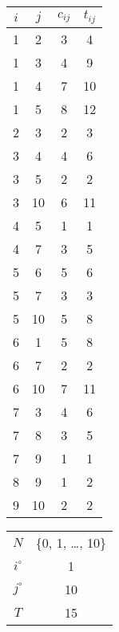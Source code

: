 \documentclass[12pt, letterpaper]{article}
\begin{document}
\begin{center}
  \begin{tabular}{|c|c|c|c|}
    \hline
    \( i \) & \( j \) & \( c_{ij} \) & \( t_{ij} \) \\
    \hline
    1       & 2       & 3            & 4            \\
    1       & 3       & 4            & 9            \\
    1       & 4       & 7            & 10           \\
    1       & 5       & 8            & 12           \\
    2       & 3       & 2            & 3            \\
    3       & 4       & 4            & 6            \\
    3       & 5       & 2            & 2            \\
    3       & 10      & 6            & 11           \\
    4       & 5       & 1            & 1            \\
    4       & 7       & 3            & 5            \\
    5       & 6       & 5            & 6            \\
    5       & 7       & 3            & 3            \\
    5       & 10      & 5            & 8            \\
    6       & 1       & 5            & 8            \\
    6       & 7       & 2            & 2            \\
    6       & 10      & 7            & 11           \\
    7       & 3       & 4            & 6            \\
    7       & 8       & 3            & 5            \\
    7       & 9       & 1            & 1            \\
    8       & 9       & 1            & 2            \\
    9       & 10      & 2            & 2            \\
    \hline
  \end{tabular}
\end{center}

\begin{center}
  \begin{tabular}{|c|c|}
    \hline
    \( N \)       & \{0, 1, \dots, 10\} \\
    \( i^\circ \) & 1                   \\
    \( j^\circ \) & 10                  \\
    \( T \)       & 15                  \\
    \hline
  \end{tabular}
\end{center}
\end{document}
